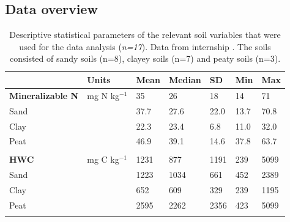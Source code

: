 \documentclass[10pt,twoside,dutch,english]{report}
\begin{document}
\begin{appendices}
\section{Data overview}
	\footnotesize 
			\begin{longtabu} to \textwidth{X[1.6,l]X[1,l]X[1,r]X[1,r]X[1,r]X[1,r]X[1,r]}
           \caption{Descriptive statistical parameters of the relevant soil variables that were used for the data analysis (\textit{n=17}). Data from internship \cite{Echeverri2014}. The soils consisted of sandy soils (n=8), clayey soils (n=7) and peaty soils (n=3).} \label{tab: results_char} \\
            	

			\toprule \rowfont{\bfseries}
			& Units & Mean & Median & SD & Min & Max \\ \midrule 
            \endhead
          

		\textbf{Mineralizable N }& mg N kg$ ^{-1} $ & 35 & 26 & 18 & 14 & 71 \\  
         \quad Sand &  & 37.7 & 27.6 & 22.0 & 13.7 & 70.8 \\ 
          \quad Clay&  & 22.3 & 23.4 & 6.8 & 11.0 & 32.0 \\ 
          \quad Peat & & 46.9 & 39.1 & 14.6 & 37.8 & 63.7 \\  \\
       
		\textbf{HWC} & mg C kg$ ^{-1} $ & 1231& 877 & 1191 & 239 & 5099 \\ 
        \quad Sand &  & 1223 & 1034 & 661 & 452 & 2389 \\ 
        \quad Clay &  & 652 & 609 & 329 & 239 & 1195 \\ 
        \quad Peat &  & 2595 & 2262 & 2356 & 423 & 5099 \\ \\
        

\end{longtabu}
\end{appendices}
\end{document}
